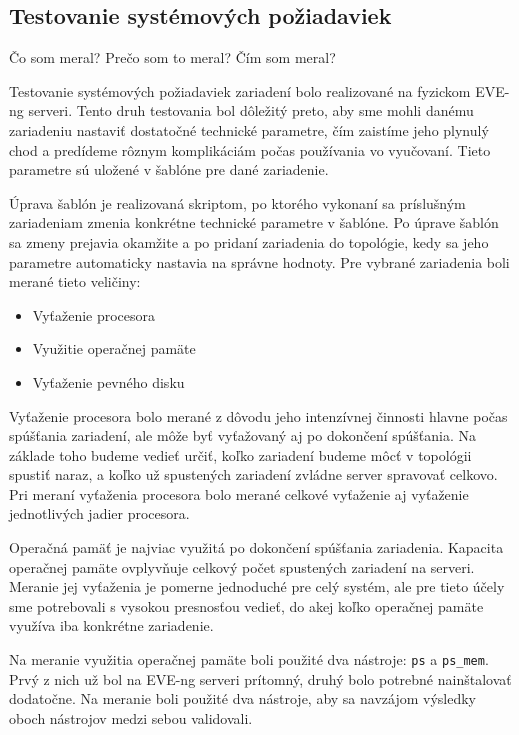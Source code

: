 \subsection{Testovanie systémových požiadaviek}
\label{chap:testovanie_zariadeni_benchmark}

Čo som meral?
Prečo som to meral?
Čím som meral?

Testovanie systémových požiadaviek zariadení bolo realizované na fyzickom EVE-ng serveri. Tento druh testovania bol dôležitý preto, aby sme mohli danému zariadeniu nastaviť dostatočné technické parametre, čím zaistíme jeho plynulý chod a predídeme rôznym komplikáciám počas používania vo vyučovaní. Tieto parametre sú uložené v šablóne pre dané zariadenie.

Úprava šablón je realizovaná skriptom, po ktorého vykonaní sa príslušným zariadeniam zmenia konkrétne technické parametre v šablóne. Po úprave šablón sa zmeny prejavia okamžite a po pridaní zariadenia do topológie, kedy sa jeho parametre automaticky nastavia na správne hodnoty. Pre vybrané zariadenia boli merané tieto veličiny:

\begin{itemize}
\item Vyťaženie procesora
\item Využitie operačnej pamäte
\item Vyťaženie pevného disku
\end{itemize}

Vyťaženie procesora bolo merané z dôvodu jeho intenzívnej činnosti hlavne počas spúšťania zariadení, ale môže byť vyťažovaný aj po dokončení spúšťania. Na základe toho budeme vedieť určiť, koľko zariadení budeme môcť v topológii spustiť naraz, a koľko už spustených zariadení zvládne server spravovať celkovo. Pri meraní vyťaženia procesora bolo merané celkové vyťaženie aj vyťaženie jednotlivých jadier procesora.

Operačná pamäť je najviac využitá po dokončení spúšťania zariadenia. Kapacita operačnej pamäte ovplyvňuje celkový počet spustených zariadení na serveri. Meranie jej vyťaženia je pomerne jednoduché pre celý systém, ale pre tieto účely sme potrebovali s vysokou presnosťou vedieť, do akej koľko operačnej pamäte využíva iba konkrétne zariadenie.

Na meranie využitia operačnej pamäte boli použité dva nástroje: \texttt{ps} a \texttt{ps\_mem}. Prvý z nich už bol na EVE-ng serveri prítomný, druhý bolo potrebné nainštalovať dodatočne. Na meranie boli použité dva nástroje, aby sa navzájom výsledky oboch nástrojov medzi sebou validovali.

